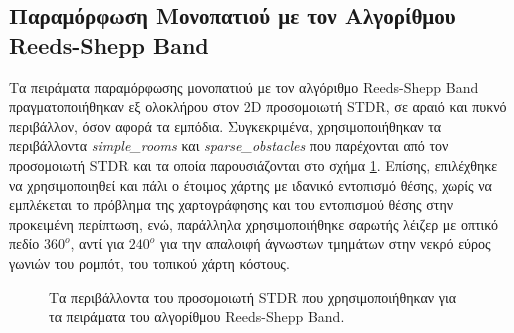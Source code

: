 \subsection{Παραμόρφωση Μονοπατιού με τον Αλγορίθμου Reeds-Shepp Band} \label{ssec:rsband_experiments}
Τα πειράματα παραμόρφωσης μονοπατιού με τον αλγόριθμο Reeds-Shepp Band πραγματοποιήθηκαν εξ ολοκλήρου στον 2D προσομοιωτή STDR, σε αραιό και πυκνό περιβάλλον, όσον αφορά τα εμπόδια. Συγκεκριμένα, χρησιμοποιήθηκαν τα περιβάλλοντα  \textit{simple{\_}rooms} και \textit{sparse{\_}obstacles} που παρέχονται από τον προσομοιωτή STDR και τα οποία παρουσιάζονται στο σχήμα \ref{fig:rsband_stdr_environments}. Επίσης, επιλέχθηκε να χρησιμοποιηθεί και πάλι ο έτοιμος χάρτης με ιδανικό εντοπισμό θέσης, χωρίς να εμπλέκεται το πρόβλημα της χαρτογράφησης και του εντοπισμού θέσης στην προκειμένη περίπτωση, ενώ, παράλληλα χρησιμοποιήθηκε σαρωτής λέιζερ με οπτικό πεδίο $360^o$, αντί για $240^o$ για την απαλοιφή άγνωστων τμημάτων στην νεκρό εύρος γωνιών του ρομπότ, του τοπικού χάρτη κόστους.

\begin{figure}[!ht]
	\centering
	\hspace{0.1\linewidth}
	\caption{Τα περιβάλλοντα του προσομοιωτή STDR που χρησιμοποιήθηκαν για τα πειράματα του αλγορίθμου Reeds-Shepp Band.}
	\label{fig:rsband_stdr_environments}
\end{figure}

